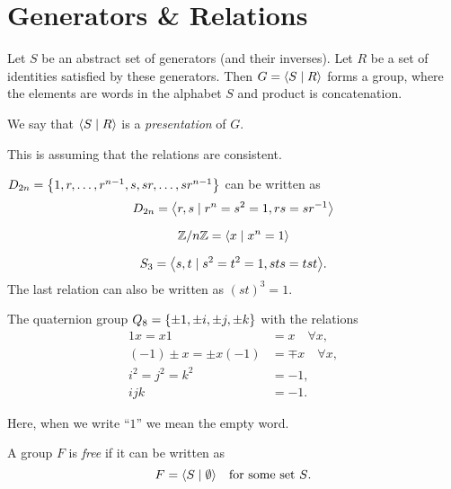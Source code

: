\section{Generators \& Relations} \label{sec:genrel}
\begin{definition}[Presentation] \label{def:genrel:presentation}
    Let $S$ be an abstract set of generators (and their inverses).
    Let $R$ be a set of identities satisfied by these generators.
    Then $G = \angled{S \mid R}$ forms a group, where the elements are words
    in the alphabet $S$ and product is concatenation.

    We say that $\angled{S \mid R}$ is a \emph{presentation} of $G$.
\end{definition}
This is assuming that the relations are consistent.

\begin{examples}
    \item $D_{2n} = \set{1, r, \dots, r^{n-1}, s, sr, \dots, sr^{n-1}}$
    can be written as \[
        D_{2n} = \angled{r, s \mid r^n = s^2 = 1, rs = sr^{-1}}
    \]
    \item \[
        \Z/n\Z = \angled{x \mid x^n = 1}
    \]
    \item \[
        S_3 = \angled{s, t \mid s^2 = t^2 = 1, sts = tst}.
    \] The last relation can also be written as $(st)^3 = 1$.
    \item The quaternion group $Q_8 = \set{\pm 1, \pm i, \pm j, \pm k}$
    with the relations \begin{align*}
        1 x = x 1 &= x \quad \forall x, \\
        (-1) \pm x = \pm x (-1) &= \mp x \quad \forall x, \\
        i^2 = j^2 = k^2 &= -1, \\
        ijk &= -1.
    \end{align*}
\end{examples}
Here, when we write ``$1$'' we mean the empty word.

\begin{definition} \label{def:genrel:free_group}
    A group $F$ is \emph{free} if it can be written as \[
        F = \angled{S \mid \emptyset} \quad \text{for some set $S$.}
    \]
\end{definition}

